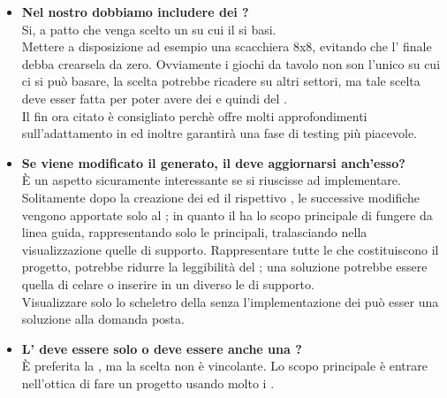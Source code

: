 \begin{itemize}
\newpage			  	
	      \item
	      \textbf{Nel nostro  dobbiamo includere dei ?\\}
		\justifying
		Si, a patto che venga scelto un  su cui il  si basi.\\
		Mettere a disposizione ad esempio una scacchiera 8x8, evitando che l' finale debba crearsela da zero.
		Ovviamente i giochi da tavolo non son l'unico  su cui ci si può basare, la scelta potrebbe ricadere su altri settori, ma tale scelta deve esser fatta per poter avere dei  e quindi del .\\
	Il  fin ora citato è consigliato perchè offre molti approfondimenti sull'adattamento in  ed inoltre garantirà una fase di testing più piacevole. \\
	
	    \item
	    \textbf{Se viene modificato il  generato, il  deve aggiornarsi anch'esso?\\}
	    \justifying
	   È un aspetto sicuramente interessante se si riuscisse ad implementare. Solitamente dopo la creazione dei  ed il rispettivo , le successive modifiche vengono apportate solo al ; in quanto il  ha lo scopo principale di fungere da linea guida, rappresentando solo le  principali, tralasciando nella visualizzazione quelle di supporto. Rappresentare tutte le  che costituiscono il progetto, potrebbe ridurre la leggibilità del ; una soluzione potrebbe essere quella di celare o inserire in un  diverso le  di supporto.\\
     Visualizzare solo lo scheletro della  senza l'implementazione dei  può esser una soluzione alla domanda posta.\\
	     
	   	 \item
	   	 \textbf{L' deve essere solo  o deve essere anche una ?\\}
	   	 \justifying
	   	 È preferita la , ma la scelta non è vincolante. Lo scopo principale è entrare nell'ottica di fare un progetto usando molto i .\\
			 	

\end{itemize}
